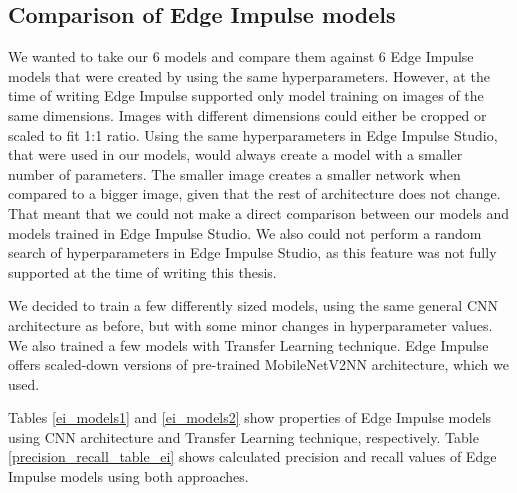 \subsection{ Comparison of Edge Impulse models}

We wanted to take our 6 models and compare them against 6 Edge Impulse models that were created by using the same hyperparameters.
However, at the time of writing Edge Impulse supported only model training on images of the same dimensions.
Images with different dimensions could either be cropped or scaled to fit 1:1 ratio.
Using the same hyperparameters in Edge Impulse Studio, that were used in our models, would always create a model with a smaller number of parameters.
The smaller image creates a smaller network when compared to a bigger image, given that the rest of architecture does not change.
That meant that we could not make a direct comparison between our models and models trained in Edge Impulse Studio.
We also could not perform a random search of hyperparameters in Edge Impulse Studio, as this feature was not fully supported at the time of writing this thesis.

We decided to train a few differently sized models, using the same general CNN architecture as before, but with some minor changes in hyperparameter values.
We also trained a few models with Transfer Learning technique.
Edge Impulse offers scaled-down versions of pre-trained MobileNetV2\footnotemark NN architecture, which we used.

Tables \ref{ei_models1} and \ref{ei_models2} show properties of Edge Impulse models using CNN architecture and Transfer Learning technique, respectively. 
Table \ref{precision_recall_table_ei} shows calculated precision and recall values of Edge Impulse models using both approaches.

